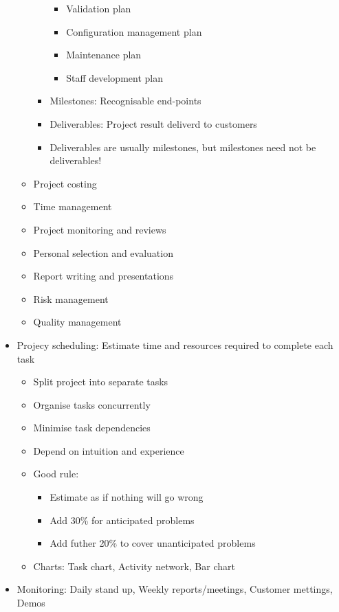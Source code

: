 \documentclass[12pt,openany]{book}
\begin{document}
\begin{itemize}
\begin{itemize}
\begin{itemize}
\begin{itemize}
                \item Validation plan
                \item Configuration management plan
                \item Maintenance plan
                \item Staff development plan
            \end{itemize}
            \item Milestones: Recognisable end-points
            \item Deliverables: Project result deliverd to customers
            \item Deliverables are usually milestones, but milestones need not be deliverables!
        \end{itemize}
        \item Project costing
        \item Time management
        \item Project monitoring and reviews
        \item Personal selection and evaluation
        \item Report writing and presentations
        \item Risk management
        \item Quality management
    \end{itemize}
    \item Projecy scheduling: Estimate time and resources required to complete each task
    \begin{itemize}
        \item Split project into separate tasks
        \item Organise tasks concurrently
        \item Minimise task dependencies
        \item Depend on intuition and experience
        \item Good rule:
        \begin{itemize}
            \item Estimate as if nothing will go wrong
            \item Add 30\% for anticipated problems
            \item Add futher 20\% to cover unanticipated problems
        \end{itemize}
        \item Charts: Task chart, Activity network, Bar chart
    \end{itemize}
    \item Monitoring: Daily stand up, Weekly reports/meetings, Customer mettings, Demos

\end{itemize}
\end{document}
